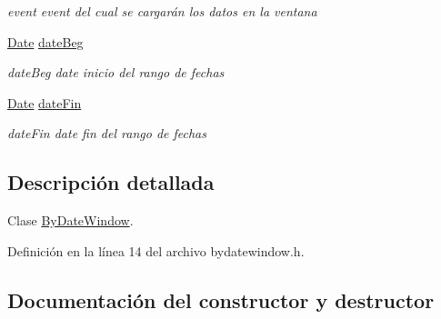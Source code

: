 \begin{DoxyCompactItemize}
\begin{DoxyCompactList}\small\item\em event event del cual se cargarán los datos en la ventana \end{DoxyCompactList}\item 
\hyperlink{class_date}{Date} \hyperlink{class_by_date_window_ae5c7c0a683a62d39adab2cb970191a36}{date\+Beg}\hypertarget{class_by_date_window_ae5c7c0a683a62d39adab2cb970191a36}{}\label{class_by_date_window_ae5c7c0a683a62d39adab2cb970191a36}

\begin{DoxyCompactList}\small\item\em date\+Beg date inicio del rango de fechas \end{DoxyCompactList}\item 
\hyperlink{class_date}{Date} \hyperlink{class_by_date_window_a59f3946fff2b2b8333a42d7b2beecdca}{date\+Fin}\hypertarget{class_by_date_window_a59f3946fff2b2b8333a42d7b2beecdca}{}\label{class_by_date_window_a59f3946fff2b2b8333a42d7b2beecdca}

\begin{DoxyCompactList}\small\item\em date\+Fin date fin del rango de fechas \end{DoxyCompactList}\end{DoxyCompactItemize}


\subsection{Descripción detallada}
Clase \hyperlink{class_by_date_window}{By\+Date\+Window}. 

Definición en la línea 14 del archivo bydatewindow.\+h.



\subsection{Documentación del constructor y destructor}
